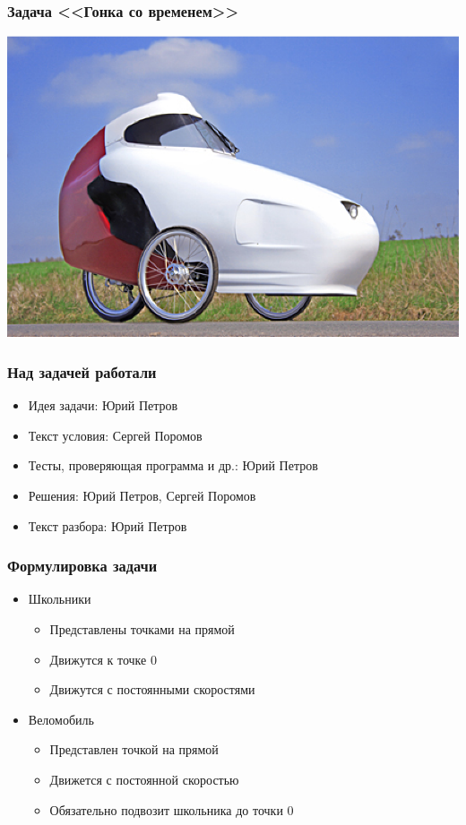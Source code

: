 \begin{frame}
  \frametitle{Задача <<Гонка со временем>>}
  \begin{center}
    \includegraphics{race-1.eps}
  \end{center}
\end{frame}

\begin{frame}
  \frametitle{Над задачей работали}
  \begin{itemize}
    \item Идея задачи: Юрий Петров
    \item Текст условия: Сергей Поромов
    \item Тесты, проверяющая программа и др.: Юрий Петров
    \item Решения: Юрий Петров, Сергей Поромов
    \item Текст разбора: Юрий Петров
  \end{itemize}
\end{frame}

\begin{frame}
  \frametitle{Формулировка задачи}
  \begin{itemize}
    \item
      Школьники
      \begin{itemize}
        \item Представлены точками на прямой
        \item Движутся к точке $0$
        \item Движутся с постоянными скоростями
      \end{itemize}
    \item
      Веломобиль
      \begin{itemize}
        \item Представлен точкой на прямой
        \item Движется с постоянной скоростью
        \item Обязательно подвозит школьника до точки $0$
      \end{itemize}
  \end{itemize}
\end{frame}

